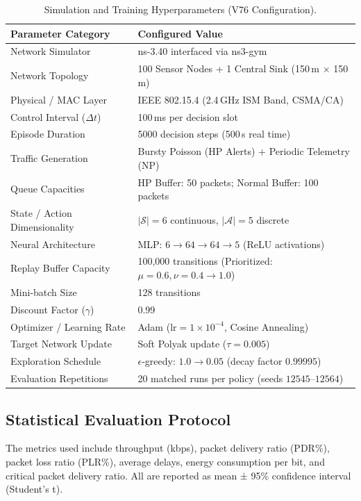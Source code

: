 \documentclass[runningheads,a4paper]{llncs}
\begin{document}
\begin{table}[t]
\centering
\caption{Simulation and Training Hyperparameters (V76 Configuration).}
\label{tab:setup}
\scriptsize
\setlength{\tabcolsep}{6pt}
\begin{tabular}{ll}
\toprule
\textbf{Parameter Category} & \textbf{Configured Value} \\
\midrule
Network Simulator & ns-3.40 interfaced via ns3-gym \\
Network Topology & 100 Sensor Nodes + 1 Central Sink (150\,m $\times$ 150\,m) \\
Physical / MAC Layer & IEEE 802.15.4 (2.4\,GHz ISM Band, CSMA/CA) \\
Control Interval ($\Delta t$) & 100\,ms per decision slot \\
Episode Duration & 5000 decision steps (500\,s real time) \\
Traffic Generation & Bursty Poisson (HP Alerts) + Periodic Telemetry (NP) \\
Queue Capacities & HP Buffer: 50 packets; Normal Buffer: 100 packets \\
State / Action Dimensionality & $|\mathcal{S}| = 6$ continuous, $|\mathcal{A}| = 5$ discrete \\
Neural Architecture & MLP: $6 \to 64 \to 64 \to 5$ (ReLU activations) \\
Replay Buffer Capacity & 100,000 transitions (Prioritized: $\mu=0.6, \nu=0.4 \to 1.0$) \\
Mini-batch Size & 128 transitions \\
Discount Factor ($\gamma$) & 0.99 \\
Optimizer / Learning Rate & Adam ($\text{lr} = 1 \times 10^{-4}$, Cosine Annealing) \\
Target Network Update & Soft Polyak update ($\tau = 0.005$) \\
Exploration Schedule & $\epsilon$-greedy: $1.0 \to 0.05$ (decay factor $0.99995$) \\
Evaluation Repetitions & 20 matched runs per policy (seeds $12545$--$12564$) \\
\bottomrule
\end{tabular}
\end{table}

\subsection{Statistical Evaluation Protocol}
The metrics used include throughput (kbps), packet delivery ratio (PDR\%),
packet loss ratio (PLR\%), average delays, energy consumption per bit, and critical packet delivery ratio. All are reported as mean ± 95\% confidence interval (Student’s t).
\end{document}
